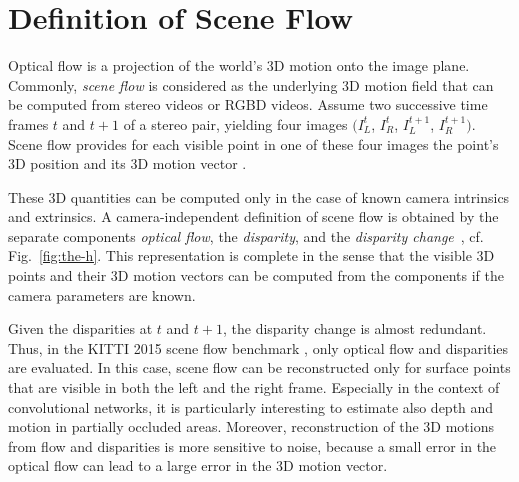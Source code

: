 \documentclass[10pt,twocolumn,letterpaper]{article}
\begin{document}
\section{Definition of Scene Flow}\label{sec:def_sf}

Optical flow is a projection of the world's 3D motion onto the image plane.
Commonly, \emph{scene flow} is considered as the underlying 3D motion field that can be computed from stereo videos or RGBD videos. Assume two successive time frames $t$ and $t\!+\!1$ of a stereo pair, yielding four images $(I^{t}_L$, $I^{t}_R$, $I^{t+1}_L$, $I^{t+1}_R)$. Scene flow provides for each visible point in one of these four images the point's 3D position and its 3D motion vector \cite{VedulaSF99}.

These 3D quantities can be computed only in the case of known camera intrinsics and extrinsics.
A camera-independent definition of scene flow is obtained by the separate components \emph{optical flow}, the \emph{disparity}, and the \emph{disparity change}~\cite{HD07}, cf. Fig.~\ref{fig:the-h}.
This representation is complete in the sense that the visible 3D points and their 3D motion vectors can be computed from the components if the camera parameters are known. 

Given the disparities at $t$ and $t\!+\!1$, the disparity change is almost redundant.
Thus, in the KITTI 2015 scene flow benchmark \cite{Menze2015CVPR}, only optical flow and disparities are evaluated.
In this case, scene flow can be reconstructed only for surface points that are visible in both the left and the right frame. 
Especially in the context of convolutional networks, it is particularly interesting to estimate also depth and motion in partially occluded areas. 
Moreover, reconstruction of the 3D motions from flow and disparities is more sensitive to noise, because a small error in the optical flow can lead to a large error in the 3D motion vector.
\end{document}
